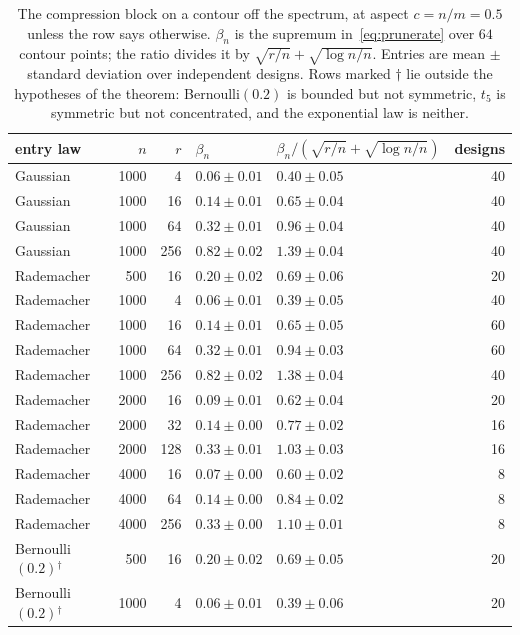 \documentclass[11pt]{article}
\theoremstyle{definition}
\begin{document}
\begin{table}[htbp]
\centering\small
\caption{The compression block on a contour off the spectrum, at aspect $c=n/m=0.5$ unless the row
says otherwise. $\beta_n$ is the supremum in~\eqref{eq:prunerate} over $64$ contour points;
the ratio divides it by $\sqrt{r/n}+\sqrt{\log n/n}$. Entries are mean $\pm$ standard deviation over
independent designs. Rows marked $\dagger$ lie outside the hypotheses of the theorem:
Bernoulli$(0.2)$ is bounded but not symmetric, $t_5$ is symmetric but not concentrated, and the
exponential law is neither.}
\label{tab:prunerate}
\begin{tabular}{lrrllr}
\toprule
entry law & $n$ & $r$ & $\beta_n$ & $\beta_n/(\sqrt{r/n}+\sqrt{\log n/n})$ & designs\\
\midrule
Gaussian & 1000 & 4 & $0.06\pm0.01$ & $0.40\pm0.05$ & 40\\
Gaussian & 1000 & 16 & $0.14\pm0.01$ & $0.65\pm0.04$ & 40\\
Gaussian & 1000 & 64 & $0.32\pm0.01$ & $0.96\pm0.04$ & 40\\
Gaussian & 1000 & 256 & $0.82\pm0.02$ & $1.39\pm0.04$ & 40\\
Rademacher & 500 & 16 & $0.20\pm0.02$ & $0.69\pm0.06$ & 20\\
Rademacher & 1000 & 4 & $0.06\pm0.01$ & $0.39\pm0.05$ & 40\\
Rademacher & 1000 & 16 & $0.14\pm0.01$ & $0.65\pm0.05$ & 60\\
Rademacher & 1000 & 64 & $0.32\pm0.01$ & $0.94\pm0.03$ & 60\\
Rademacher & 1000 & 256 & $0.82\pm0.02$ & $1.38\pm0.04$ & 40\\
Rademacher & 2000 & 16 & $0.09\pm0.01$ & $0.62\pm0.04$ & 20\\
Rademacher & 2000 & 32 & $0.14\pm0.00$ & $0.77\pm0.02$ & 16\\
Rademacher & 2000 & 128 & $0.33\pm0.01$ & $1.03\pm0.03$ & 16\\
Rademacher & 4000 & 16 & $0.07\pm0.00$ & $0.60\pm0.02$ & 8\\
Rademacher & 4000 & 64 & $0.14\pm0.00$ & $0.84\pm0.02$ & 8\\
Rademacher & 4000 & 256 & $0.33\pm0.00$ & $1.10\pm0.01$ & 8\\
Bernoulli$(0.2)$$^{\dagger}$ & 500 & 16 & $0.20\pm0.02$ & $0.69\pm0.05$ & 20\\
Bernoulli$(0.2)$$^{\dagger}$ & 1000 & 4 & $0.06\pm0.01$ & $0.39\pm0.06$ & 20\\

\end{tabular}
\end{table}
\end{document}
